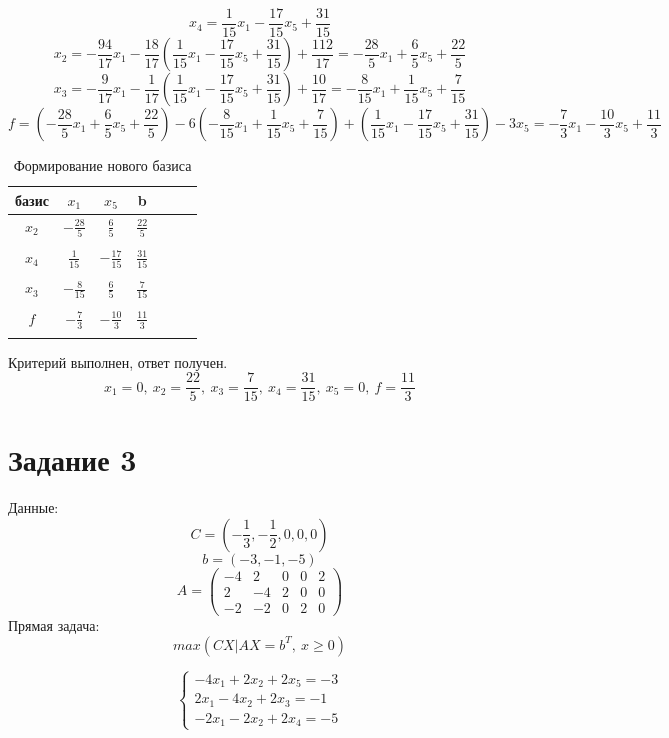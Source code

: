 \documentclass{article}
\begin{document}
\[x_4 = \frac{1}{15}x_1 - \frac{17}{15}x_5 +\frac{31}{15}\]
\[x_2 = - \frac{94}{17}x_1 - \frac{18}{17}(\frac{1}{15}x_1 - \frac{17}{15}x_5 +\frac{31}{15}) +\frac{112}{17} = 
-\frac{28}{5}x_1+\frac{6}{5}x_5 +\frac{22}{5}
\]
\[x_3 = -\frac{9}{17}x_1 -\frac{1}{17}(\frac{1}{15}x_1 - \frac{17}{15}x_5 +\frac{31}{15}) +\frac{10}{17} = 
-\frac{8}{15}x_1 + \frac{1}{15}x_5 +\frac{7}{15}
\]
\[f = (-\frac{28}{5}x_1+\frac{6}{5}x_5 +\frac{22}{5})-6(-\frac{8}{15}x_1 + \frac{1}{15}x_5 +\frac{7}{15})+(\frac{1}{15}x_1 - \frac{17}{15}x_5 +\frac{31}{15})-3x_5 = 
-\frac{7}{3}x_1 - \frac{10}{3}x_5 +\frac{11}{3}\]

\begin{table}[H]
    \centering
    \caption{Формирование нового базиса}
    \begin{tabular}{|c|c|c|c|c|c|c|}
    \hline
        базис   & $x_1$            & $x_5$             & b \\ \hline
        $x_2$ 	&$-\frac{28}{5}$  &$\frac{6}{5}$	&$\frac{22}{5}$ \\
        &&& \\
        $x_4$ 	&$\frac{1}{15}$	   &$- \frac{17}{15}$&	$\frac{31}{15}$ \\
        &&& \\
        $x_3$  	&$-\frac{8}{15}$   &$\frac{6}{5}$	&$\frac{7}{15}$ \\
        &&& \\
        $f$  	&$-\frac{7}{3}$	&$- \frac{10}{3}$	&$\frac{11}{3}$ \\
        &&& \\ \hline
    \end{tabular}
\end{table}
Критерий выполнен, ответ получен. 
\[x_1 = 0,\ x_2 = \frac{22}{5}, \ x_3 = \frac{7}{15},\ x_4 = \frac{31}{15},\ x_5 = 0,\ f = \frac{11}{3}\]
\section*{Задание 3}

Данные:
\[C = (-\frac{1}{3}, -\frac{1}{2}, 0, 0, 0)\]
\[b = (-3, -1 ,-5)\]
\[A = \begin{pmatrix}
    -4&2&0&0&2\\
    2&-4&2&0&0\\
    -2&-2&0&2&0
\end{pmatrix}\]
Прямая задача:
\[max(CX|AX = b^T,\ x\geq 0)\]

\[\begin{cases}
    -4x_1+2x_2+2x_5 = -3\\
    2x_1 -4x_2+2x_3 = -1\\
    -2x_1-2x_2+2x_4 = -5
\end{cases}\]
\end{document}
